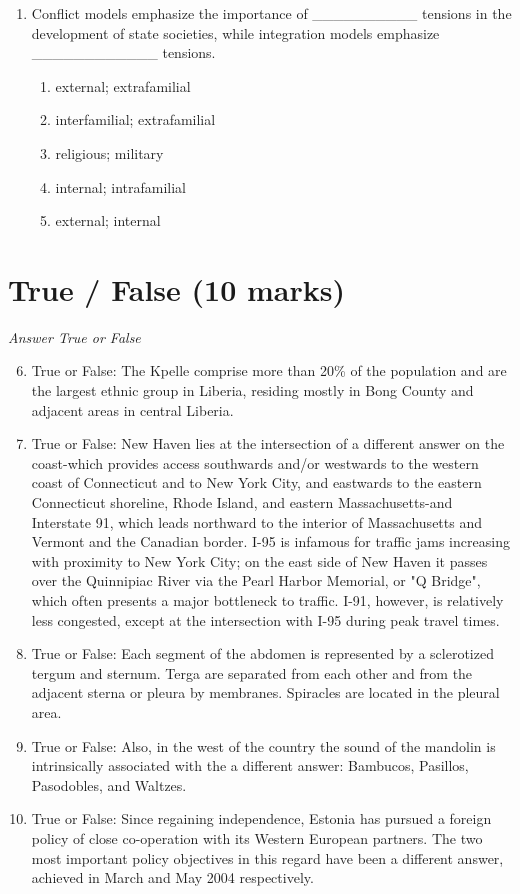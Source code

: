 \documentclass[12pt]{article}
\begin{document}
\begin{enumerate}[label=\arabic*.]
\begin{enumerate}[label=(\alph*)]
    \item legal and judicial systems.
    \item political and military history.
\end{enumerate}
\item Conflict models emphasize the importance of \_\_\_\_\_\_\_\_\_\_ tensions in the development of state societies, while integration models emphasize \_\_\_\_\_\_\_\_\_\_\_\_ tensions.
\begin{enumerate}[label=(\alph*)]
    \item external; extrafamilial
    \item interfamilial; extrafamilial
    \item religious; military
    \item internal; intrafamilial
    \item external; internal
\end{enumerate}
\end{enumerate}

\section*{True / False (10 marks)}
\textit{Answer True or False}
\begin{enumerate}[label=\arabic*.]
\setcounter{enumi}{5}
\item True or False: The Kpelle comprise more than 20\% of the population and are the largest ethnic group in Liberia, residing mostly in Bong County and adjacent areas in central Liberia.
\item True or False: New Haven lies at the intersection of a different answer on the coast-which provides access southwards and/or westwards to the western coast of Connecticut and to New York City, and eastwards to the eastern Connecticut shoreline, Rhode Island, and eastern Massachusetts-and Interstate 91, which leads northward to the interior of Massachusetts and Vermont and the Canadian border. I-95 is infamous for traffic jams increasing with proximity to New York City; on the east side of New Haven it passes over the Quinnipiac River via the Pearl Harbor Memorial, or "Q Bridge", which often presents a major bottleneck to traffic. I-91, however, is relatively less congested, except at the intersection with I-95 during peak travel times.
\item True or False: Each segment of the abdomen is represented by a sclerotized tergum and sternum. Terga are separated from each other and from the adjacent sterna or pleura by membranes. Spiracles are located in the pleural area.
\item True or False: Also, in the west of the country the sound of the mandolin is intrinsically associated with the a different answer: Bambucos, Pasillos, Pasodobles, and Waltzes.
\item True or False: Since regaining independence, Estonia has pursued a foreign policy of close co-operation with its Western European partners. The two most important policy objectives in this regard have been a different answer, achieved in March and May 2004 respectively.
\end{enumerate}
\end{document}
